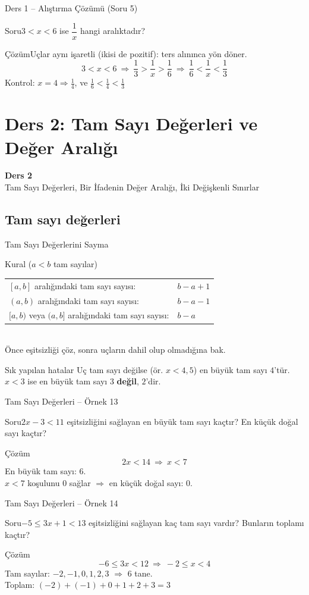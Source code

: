 \documentclass[aspectratio=169,11pt,handout]{beamer}
\newcommand{\soru}[3]{%
\begin{frame}{#1}
  \begin{block}{Soru}\large #2\end{block}
  \pause
  \begin{exampleblock}{Çözüm}\large #3\end{exampleblock}
\end{frame}}
\begin{document}
\soru{Ders 1 -- Alıştırma Çözümü (Soru 5)}
{\(3<x<6\) ise \(\dfrac1x\) hangi aralıktadır?}
{Uçlar aynı işaretli (ikisi de pozitif): ters alınınca yön döner.
\[3<x<6\ \Rightarrow\ \frac13>\frac1x>\frac16\ \Rightarrow\ \frac16<\frac1x<\frac13\]
Kontrol: \(x=4\Rightarrow \frac14\), ve \(\frac16<\frac14<\frac13\) \checkmark}

\section{Ders 2: Tam Sayı Değerleri ve Değer Aralığı}
\begin{frame}
\centering\Large\color{anamavi}\textbf{Ders 2}\\[6pt]\normalsize Tam Sayı Değerleri, Bir İfadenin Değer Aralığı, İki Değişkenli Sınırlar
\end{frame}

\subsection{Tam sayı değerleri}
\begin{frame}{Tam Sayı Değerlerini Sayma}
\begin{block}{Kural (\(a<b\) tam sayılar)}
\renewcommand{\arraystretch}{1.2}
\begin{tabular}{@{}ll@{}}
\([a,b]\) aralığındaki tam sayı sayısı: & \(b-a+1\)\\
\((a,b)\) aralığındaki tam sayı sayısı: & \(b-a-1\)\\
\([a,b)\) veya \((a,b]\) aralığındaki tam sayı sayısı: & \(b-a\)
\end{tabular}\\[3pt]
Önce eşitsizliği çöz, sonra uçların dahil olup olmadığına bak.
\end{block}
\begin{alertblock}{Sık yapılan hatalar}
Uç tam sayı değilse (ör. \(x<4{,}5\)) en büyük tam sayı \(4\)'tür. \quad
\(x<3\) ise en büyük tam sayı \(3\) \textbf{değil}, \(2\)'dir.
\end{alertblock}
\end{frame}

\soru{Tam Sayı Değerleri -- Örnek 13}
{\(2x-3<11\) eşitsizliğini sağlayan en büyük tam sayı kaçtır? En küçük doğal sayı kaçtır?}
{\[2x<14\ \Rightarrow\ x<7\]
En büyük tam sayı: \(6\).\\[3pt]
\(x<7\) koşulunu \(0\) sağlar \(\Rightarrow\) en küçük doğal sayı: \(0\).}

\soru{Tam Sayı Değerleri -- Örnek 14}
{\(-5\le 3x+1<13\) eşitsizliğini sağlayan kaç tam sayı vardır? Bunların toplamı kaçtır?}
{\[-6\le 3x<12\ \Rightarrow\ -2\le x<4\]
Tam sayılar: \(-2,-1,0,1,2,3\) \(\Rightarrow\) \(6\) tane.\\[3pt]
Toplam: \((-2)+(-1)+0+1+2+3=3\)}
\end{document}
